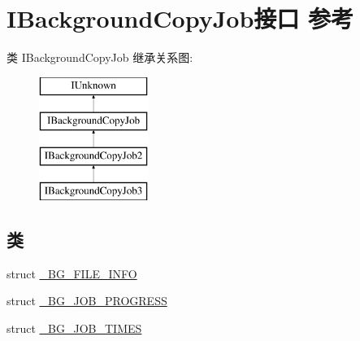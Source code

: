 \hypertarget{interface_i_background_copy_job}{}\section{I\+Background\+Copy\+Job接口 参考}
\label{interface_i_background_copy_job}
类 I\+Background\+Copy\+Job 继承关系图\+:\begin{figure}[H]
\begin{center}
\leavevmode
\includegraphics[height=4.000000cm]{interface_i_background_copy_job}
\end{center}
\end{figure}
\subsection*{类}
\begin{DoxyCompactItemize}
\item 
struct \hyperlink{struct_i_background_copy_job_1_1___b_g___f_i_l_e___i_n_f_o}{\+\_\+\+B\+G\+\_\+\+F\+I\+L\+E\+\_\+\+I\+N\+FO}
\item 
struct \hyperlink{struct_i_background_copy_job_1_1___b_g___j_o_b___p_r_o_g_r_e_s_s}{\+\_\+\+B\+G\+\_\+\+J\+O\+B\+\_\+\+P\+R\+O\+G\+R\+E\+SS}
\item 
struct \hyperlink{struct_i_background_copy_job_1_1___b_g___j_o_b___t_i_m_e_s}{\+\_\+\+B\+G\+\_\+\+J\+O\+B\+\_\+\+T\+I\+M\+ES}
\end{DoxyCompactItemize}
